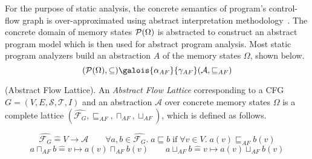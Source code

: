 For the purpose of static analysis, the concrete semantics of program's
control-flow graph is over-approximated using abstract interpretation
methodology~\cite{CC79}. The concrete domain of memory states 
$\mathcal{P}({\Omega})$ is abstracted to construct an abstract program
model which is then used for abstract program analysis.  Most static program
analyzers build an abstraction $A$ of the memory states $\Omega$, shown below. 
\[
  (\powerset({\Omega}),\subseteq)
    \galois{\alpha_{AF}}{\gamma_{AF}}
    (\mathcal{A},\sqsubseteq_{AF})
\]
%
\begin{definition} (Abstract Flow Lattice). An \emph{Abstract Flow Lattice}
  corresponding to a CFG $G= (V, E, \mathcal{S}, \mathcal{T}, I)$ and 
  an abstraction $\mathcal{A}$ over concrete memory states $\Omega$
  is a complete lattice $(\widehat{\mathcal{F}_{G}}, \sqsubseteq_{AF}, \sqcap_{AF},
  \sqcup_{AF})$, 
  which is defined as follows. 
\end{definition}
  \[
    \widehat{\mathcal{F}_{G}} \mathrel{\hat=} V \rightarrow \mathcal{A} \qquad \forall a,b \in
     \widehat{\mathcal{F}_{G}}.\; a \sqsubseteq b\; \text{if}\; \forall v \in V.\; a(v)
     \sqsubseteq_{AF} b(v) 
  \]
%
  \[
    a \sqcap_{AF} b \mathrel{\hat=} v \mapsto a(v) \sqcap_{AF} b(v) \qquad 
     a \sqcup_{AF} b \mathrel{\hat=} v \mapsto a(v) \sqcup_{AF} b(v)
  \]
%
